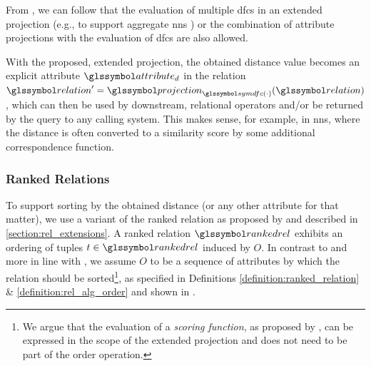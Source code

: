 From , we can follow that the evaluation of multiple \acrshort{dfc}s in an extended projection (e.g., to support aggregate \acrshort{nns} \cite{Papadias:2005Aggregate}) or the combination of attribute projections with the evaluation of \acrshort{dfc}s are also allowed.

With the proposed, extended projection, the obtained distance value becomes an explicit attribute $\attribute_d$ in the relation $ \relation^{\prime} = \projection_{\symdfc(\cdot)}(\relation)$, which can then be used by downstream, relational operators and/or be returned by the query to any calling system. This makes sense, for example, in \acrshort{nns}, where the distance is often converted to a similarity score by some additional correspondence function.

\subsubsection{Ranked Relations}

To support sorting by the obtained distance (or any other attribute for that matter), we use a variant of the ranked relation as proposed by \cite{Chengkai:2005RankSQL} and described in \cref{section:rel_extensions}. A ranked relation $\rankedrel$ exhibits an ordering of tuples $t \in \rankedrel$ induced by $O$. In contrast to \cite{Chengkai:2005RankSQL} and more in line with \cite{Garcia:2009Database}, we assume $O$ to be a sequence of attributes by which the relation should be sorted\footnote{We argue that the evaluation of a \emph{scoring function}, as proposed by \cite{Chengkai:2005RankSQL}, can be expressed in the scope of the extended projection and does not need to be part of the order operation.}, as specified in Definitions \ref{definition:ranked_relation} \& \ref{definition:rel_alg_order} and shown in  .

